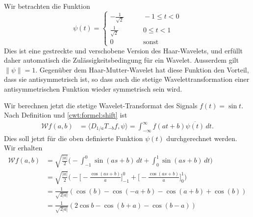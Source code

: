 \begin{beispiel}
Wir betrachten die Funktion
\begin{equation}
\psi(t) = \begin{cases}
-\frac1{\sqrt{2}}&\qquad -1\le t< 0\\
\frac1{\sqrt{2}}&\qquad 0\le t< 1\\
0&\qquad\text{sonst}
\end{cases}
\label{cwt:beispiel:psi}
\end{equation}
Dies ist eine gestreckte und verschobene Version des Haar-Wavelets,
und erfüllt daher automatisch die Zulässigkeitsbedingung für ein Wavelet.
Ausserdem gilt $\|\psi\|=1$.
Gegenüber dem Haar-Mutter-Wavelet hat diese Funktion den Vorteil, dass 
sie antisymmetrisch ist, so dass auch die stetige Wavelettransformation
einer antisymmetrischen Funktion wieder symmetrisch sein wird.

Wir berechnen jetzt die stetige Wavelet-Transformat des Signals $f(t)=\sin t$.
Nach Definition und
\eqref{cwt:formel:shift}
ist
\begin{align*}
\mathcal{W}f(a,b)
&=
\langle D_{1/a}T_{-b}f,\psi\rangle
=
\int_{-\infty}^\infty f(at+b) \overline{\psi(t)}\,dt.
\end{align*}
Dies soll jetzt für die oben definierte Funktion $\psi(t)$ durchgerechnet
werden.
Wir erhalten
\begin{align*}
\mathcal{W}f(a,b)
&=
\sqrt{\frac{|a|}{2}}
\biggl(
-
\int_{-1}^0 \sin(as+b)\,dt
+
\int_{0}^1 \sin(as+b)\,dt
\biggr)
\\
&=
\sqrt{\frac{|a|}{2}}
\biggl(
-
\biggl[-\frac{\cos(as+b)}{a}\biggr]_{-1}^0
+
\biggl[-\frac{\cos(as+b)}{a}\biggr]_{0}^1
\biggr)
\\
&=
\frac{1}{\sqrt{2|a|}}
(
\cos(b) - \cos(-a+b) -\cos(a+b)+\cos(b)
)
\\
&=
\frac{1}{\sqrt{2|a|}}
(2\cos b - \cos(b+a) - \cos(b-a))
\end{align*}


\end{beispiel}
